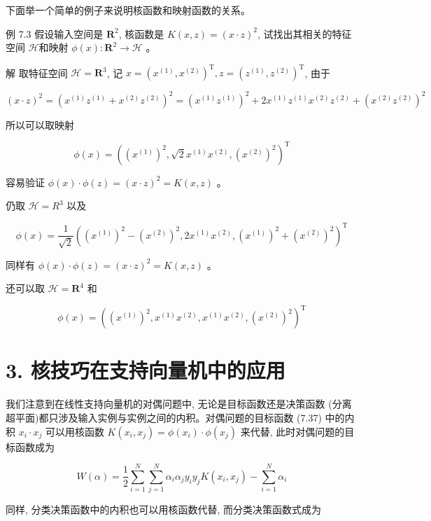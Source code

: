 \documentclass[10pt]{article}
\begin{document}
下面举一个简单的例子来说明核函数和映射函数的关系。

例 7.3 假设输入空间是 $\boldsymbol{R}^{2}$, 核函数是 $K(x, z)=(x \cdot z)^{2}$, 试找出其相关的特征空间 $\mathcal{H}$和映射 $\phi(x): \boldsymbol{R}^{2} \rightarrow \mathcal{H}$ 。

解 取特征空间 $\mathcal{H}=\boldsymbol{R}^{3}$, 记 $x=\left(x^{(1)}, x^{(2)}\right)^{\mathrm{T}}, z=\left(z^{(1)}, z^{(2)}\right)^{\mathrm{T}}$, 由于

$$
(x \cdot z)^{2}=\left(x^{(1)} z^{(1)}+x^{(2)} z^{(2)}\right)^{2}=\left(x^{(1)} z^{(1)}\right)^{2}+2 x^{(1)} z^{(1)} x^{(2)} z^{(2)}+\left(x^{(2)} z^{(2)}\right)^{2}
$$

所以可以取映射

$$
\phi(x)=\left(\left(x^{(1)}\right)^{2}, \sqrt{2} x^{(1)} x^{(2)},\left(x^{(2)}\right)^{2}\right)^{\mathrm{T}}
$$

容易验证 $\phi(x) \cdot \phi(z)=(x \cdot z)^{2}=K(x, z)$ 。

仍取 $\mathcal{H}=R^{3}$ 以及

$$
\phi(x)=\frac{1}{\sqrt{2}}\left(\left(x^{(1)}\right)^{2}-\left(x^{(2)}\right)^{2}, 2 x^{(1)} x^{(2)},\left(x^{(1)}\right)^{2}+\left(x^{(2)}\right)^{2}\right)^{\mathrm{T}}
$$

同样有 $\phi(x) \cdot \phi(z)=(x \cdot z)^{2}=K(x, z)$ 。

还可以取 $\mathcal{H}=\boldsymbol{R}^{4}$ 和

$$
\phi(x)=\left(\left(x^{(1)}\right)^{2}, x^{(1)} x^{(2)}, x^{(1)} x^{(2)},\left(x^{(2)}\right)^{2}\right)^{\mathrm{T}}
$$

\section*{3. 核技巧在支持向量机中的应用}
我们注意到在线性支持向量机的对偶问题中, 无论是目标函数还是决策函数 (分离超平面)都只涉及输入实例与实例之间的内积。对偶问题的目标函数 (7.37) 中的内积 $x_{i} \cdot x_{j}$ 可以用核函数 $K\left(x_{i}, x_{j}\right)=\phi\left(x_{i}\right) \cdot \phi\left(x_{j}\right)$ 来代替, 此时对偶问题的目标函数成为


\begin{equation*}
W(\alpha)=\frac{1}{2} \sum_{i=1}^{N} \sum_{j=1}^{N} \alpha_{i} \alpha_{j} y_{i} y_{j} K\left(x_{i}, x_{j}\right)-\sum_{i=1}^{N} \alpha_{i} \tag{7.67}
\end{equation*}


同样, 分类决策函数中的内积也可以用核函数代替, 而分类决策函数式成为
\end{document}

